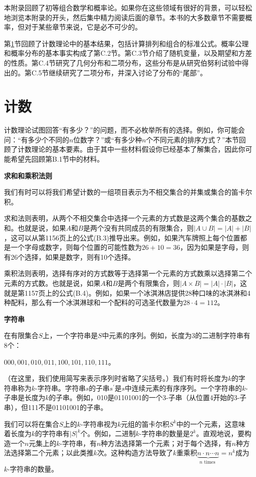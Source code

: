 \documentclass[lang=cn,newtx,10pt,scheme=chinese]{elegantbook}
\begin{document}
本附录回顾了初等组合数学和概率论。如果你在这些领域有很好的背景，可以轻松地浏览本附录的开头，然后集中精力阅读后面的章节。本书的大多数章节不需要概率，但对于某些章节来说，它是必不可少的。

第\ref{section:C.1}节回顾了计数理论中的基本结果，包括计算排列和组合的标准公式。概率公理和概率分布的基本事实构成了第C.2节。第C.3节介绍了随机变量，以及期望和方差的性质。第C.4节研究了几何分布和二项分布，这些分布是从研究伯努利试验中得出的。第C.5节继续研究了二项分布，并深入讨论了分布的“尾部”。

\section{计数}\label{section:C.1}

计数理论试图回答“有多少？”的问题，而不必枚举所有的选择。例如，你可能会问：“有多少个不同的$n$位数字？”或“有多少种$n$个不同元素的排序方式？”本节回顾了计数理论的基本要素。由于其中一些材料假设你已经基本了解集合，因此你可能希望先回顾第B.1节中的材料。

\textbf{求和和乘积法则}

我们有时可以将我们希望计数的一组项目表示为不相交集合的并集或集合的笛卡尔积。

求和法则表明，从两个不相交集合中选择一个元素的方式数是这两个集合的基数之和。也就是说，如果$A$和$B$是两个没有共同成员的有限集合，则$|A\cup B|=|A|+|B|$，这可以从第1156页上的公式(B.3)推导出来。例如，如果汽车牌照上每个位置都是一个字母或数字，则每个位置的可能性数为$26+10=36$，因为如果是字母，则有26个选择，如果是数字，则有10个选择。

乘积法则表明，选择有序对的方式数等于选择第一个元素的方式数乘以选择第二个元素的方式数。也就是说，如果$A$和$B$是两个有限集合，则$|A\times B|=|A|\cdot |B|$，这就是第1157页上的公式(B.4)。例如，如果一个冰淇淋店提供28种口味的冰淇淋和4种配料，那么有一个冰淇淋球和一个配料的可选圣代数量为$28\cdot 4=112$。

\textbf{字符串}

在有限集合$S$上，一个字符串是$S$中元素的序列。例如，长度为3的二进制字符串有8个：

$000,001,010,011,100,101,110,111$。

（在这里，我们使用简写来表示序列时省略了尖括号。）我们有时将长度为$k$的字符串称为$k$-字符串。字符串$s$的子串$s^{\prime}$是$s$中连续元素的有序序列。一个字符串的$k$-子串是长度为$k$的子串。例如，010是01101001的一个3-子串（从位置4开始的3-子串），但111不是01101001的子串。

我们可以将在集合$S$上的$k$-字符串视为$k$元组的笛卡尔积$S^k$中的一个元素，这意味着长度为$k$的字符串有$|S|^k$个。例如，二进制$k$-字符串的数量是$2^k$。直观地说，要构造一个$n$元集上的$k$-字符串，有$n$种方法选择第一个元素；对于每个选择，有$n$种方法选择第二个元素；以此类推$k$次。这种构造方法导致了$k$重乘积$\underbrace{n \cdot n \cdots n}_{n \text { times }}=n^k$成为$k$-字符串的数量。
\end{document}
